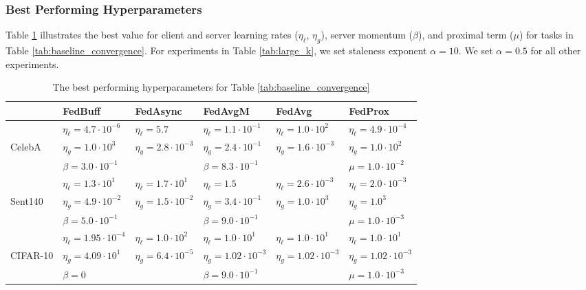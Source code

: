 \documentclass[twoside]{article}
\newcommand\Tstrut{\rule{0pt}{2.6ex}}         %
\newcommand{\algname}{{FedBuff}\xspace}
\begin{document}
\subsubsection{Best Performing Hyperparameters}
Table \ref{tab:best_hyper} illustrates the best value for client and server learning rates ($\eta_{\ell}$, $\eta_g$), server momentum ($\beta$), and proximal term ($\mu$) for tasks in Table \ref{tab:baseline_convergence}. For experiments in Table \ref{tab:large_k}, we set staleness exponent $\alpha = 10$. We set $\alpha = 0.5$ for all other experiments. 

\begin{table}
\centering
\caption{The best performing hyperparameters for Table \ref{tab:baseline_convergence}}
\label{tab:best_hyper}
\begin{tabular}{llllll} 
\toprule
 & \algname{} & FedAsync &  FedAvgM & FedAvg & FedProx  \\
\hline
\Tstrut{}
  & $\eta_{\ell}=4.7\cdot10^{-6}$ & $\eta_{\ell}=5.7$ &  $\eta_{\ell}=1.1\cdot10^{-1}$ & $\eta_{\ell}=1.0\cdot10^2$  & $\eta_{\ell}=4.9\cdot10^{-4}$ \\     
CelebA  & $\eta_g=1.0\cdot10^{3}$  & $\eta_g=2.8\cdot10^{-3}$ & $\eta_g=2.4\cdot10^{-1}$ & $\eta_g=1.6\cdot10^{-3}$ & $\eta_g=1.0\cdot10^2$   \\ 
  & $\beta=3.0\cdot10^{-1}$ &  &  $\beta=8.3\cdot10^{-1}$ &  & $\mu=1.0\cdot10^{-2}$   \\ 
\hline
\Tstrut{}
  & $\eta_{\ell}=1.3\cdot10^1$ & $\eta_{\ell}=1.7\cdot10^1$ &  $\eta_{\ell}=1.5$ & $\eta_{\ell}=2.6\cdot10^{-3}$  & $\eta_{\ell}=2.0\cdot10^{-3}$ \\     
Sent140  & $\eta_g=4.9\cdot10^{-2}$  & $\eta_g=1.5\cdot10^{-2}$ & $\eta_g=3.4\cdot10^{-1}$ & $\eta_g=1.0\cdot10^3$ & $\eta_g=1.0^3$   \\ 
  & $\beta=5.0\cdot10^{-1}$ &  &  $\beta=9.0\cdot10^{-1}$ &  & $\mu=1.0\cdot10^{-3}$   \\ 
\hline
\Tstrut{}

  & $\eta_{\ell}=1.95\cdot10^{-4}$  & $\eta_{\ell}=1.0\cdot10^{2}$  & $\eta_{\ell}=1.0\cdot10^1$  & $\eta_{\ell}=1.0\cdot10^1$  & $\eta_{\ell}=1.0\cdot10^1$  \\     
CIFAR-10  & $\eta_g=4.09\cdot10^1$ & $\eta_g=6.4\cdot10^{-5}$ & $\eta_g=1.02\cdot10^{-3}$ & $\eta_g=1.02\cdot10^{-3}$ & $\eta_g=1.02\cdot10^{-3}$ \\ 
& $\beta=0$ & & $\beta=9.0\cdot10^{-1}$  &  & $\mu=1.0\cdot10^{-3}$ \\
\bottomrule
\end{tabular}
\end{table}
\end{document}
